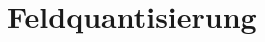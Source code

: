 \chapter{Feldquantisierung\label{chapter:feldquantisierung}}
\begin{refsection}

\printbibliography[heading=subbibliography]
\end{refsection}

